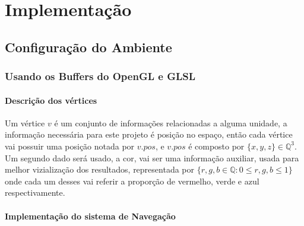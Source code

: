 

\chapter{Implementação}

\section{Configuração do Ambiente}

\subsection{Usando os Buffers do OpenGL e GLSL}

\subsubsection{Descrição dos vértices}
Um vértice $v$ é um conjunto de informações relacionadas a alguma unidade, %
a informação necessária para este projeto é posição no espaço, então cada vértice
vai possuir uma posição notada por $v.pos$, e $v.pos$ é composto por 
$\{x, y, z\} \in \mathbb{Q}^3$. Um segundo dado será usado, a cor, vai ser uma 
informação auxiliar, usada para melhor vizialização dos resultados, 
representada por $\{r, g, b \in \mathbb{Q}:0 \leq r, g, b \leq 1\}$ onde cada um desses
vai referir a proporção de vermelho, verde e azul respectivamente.

\subsubsection{Implementação do sistema de Navegação}

